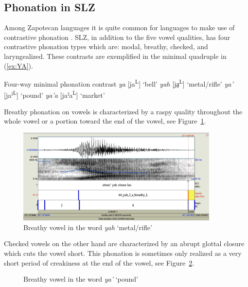 \documentclass[12pt, letterpaper]{article}
\newcommand{\supr}[1]{\textsuperscript{#1}}
\begin{document}
\subsection{Phonation in SLZ} \label{sec:Phonation}

Among Zapotecan languages it is quite common for languages to make use of contrastive phonation \citep[e.g.,][]{avelinobecerraTopicsYalalagZapotec2004,longDiccionarioZapotecoSan2005,avelinoAcousticElectroglottographicAnalyses2010,lopeznicolasEstudiosFonologiaGramatica2016,chavez-peonInteractionMetricalStructure2010}. 
SLZ, in addition to the five vowel qualities, has four contrastive phonation types which are: modal, breathy, checked, and laryngealized. These contrasts are exemplified in the minimal quadruple in (\ref{ex:YA}). 

\ea \label{ex:YA} Four-way minimal phonation contrast
	\ea \textit{ya} [ja\supr{L}]	`bell'
	\ex \textit{yah}  [ja̤\supr{L}] `metal/rifle'
	\ex \textit{ya'}  [jaˀ\supr{L}]  `pound'
	\ex \textit{ya'a}  [jaˀa\supr{L}]  `market'
	\z 
\z 

Breathy phonation on vowels is characterized by a raspy quality throughout the whole vowel or a portion toward the end of the vowel, see Figure~\ref{fig:BreathyVowel}. 

\begin{figure}[!h]
	\centering
	\includegraphics[width=0.9\textwidth]{../yah.png}
	\caption{Breathy vowel in the word \textit{yah} `metal/rifle'}
	\label{fig:BreathyVowel}
\end{figure}

Checked vowels on the other hand are characterized by an abrupt glottal closure which cuts the vowel short. This phonation is sometimes only realized as a very short period of creakiness at the end of the vowel, see Figure~\ref{fig:CheckedVowel}.  

\begin{figure}[!h]
	\caption{Breathy vowel in the word \textit{ya'} `pound'}
	\label{fig:CheckedVowel}
\end{figure}
\end{document}
